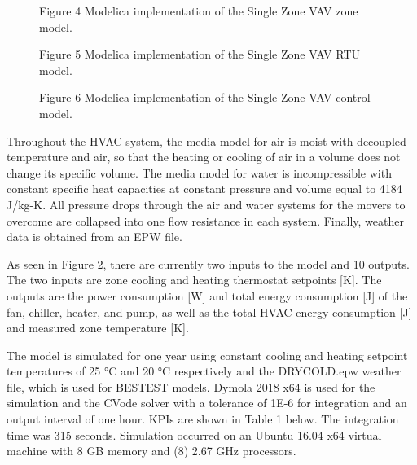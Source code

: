 \documentclass[letterpaper,10pt,english]{sphinxmanual}
\begin{document}
\begin{figure}[htbp]
\centering
\capstart

\noindent{}
\caption{Figure 4 \textendash{} Modelica implementation of the Single Zone VAV zone model.}\label{\detokenize{modelDescription:id4}}\end{figure}

\begin{figure}[htbp]
\centering
\capstart

\noindent{}
\caption{Figure 5 \textendash{} Modelica implementation of the Single Zone VAV RTU model.}\label{\detokenize{modelDescription:id5}}\end{figure}

\begin{figure}[htbp]
\centering
\capstart

\noindent{}
\caption{Figure 6 \textendash{} Modelica implementation of the Single Zone VAV control model.}\label{\detokenize{modelDescription:id6}}\end{figure}

Throughout the HVAC system, the media model for air is moist with decoupled temperature and air, so that the heating or cooling of air in a volume does not change its specific volume.  The media model for water is incompressible with constant specific heat capacities at constant pressure and volume equal to 4184 J/kg-K.  All pressure drops through the air and water systems for the movers to overcome are collapsed into one flow resistance in each system.  Finally, weather data is obtained from an EPW file.

As seen in Figure 2, there are currently two inputs to the model and 10 outputs.  The two inputs are zone cooling and heating thermostat setpoints {[}K{]}.  The outputs are the power consumption {[}W{]} and total energy consumption {[}J{]} of the fan, chiller, heater, and pump, as well as the total HVAC energy consumption {[}J{]} and measured zone temperature {[}K{]}.

The model is simulated for one year using constant cooling and heating setpoint temperatures of 25 °C and 20 °C respectively and the DRYCOLD.epw weather file, which is used for BESTEST models.  Dymola 2018 x64 is used for the simulation and the CVode solver with a tolerance of 1E-6 for integration and an output interval of one hour.  KPIs are shown in Table 1 below.  The integration time was 315 seconds.  Simulation occurred on an Ubuntu 16.04 x64 virtual machine with 8 GB memory and (8) 2.67 GHz processors.
\end{document}
